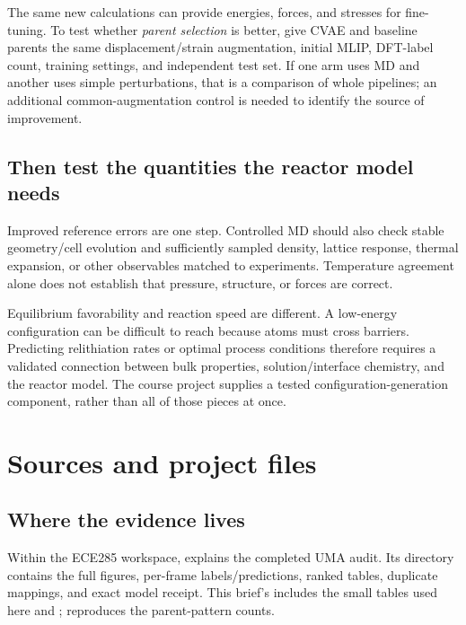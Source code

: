 The same new calculations can provide energies, forces, and stresses for fine-tuning. To test whether \emph{parent selection} is better, give CVAE and baseline parents the same displacement/strain augmentation, initial MLIP, DFT-label count, training settings, and independent test set. If one arm uses MD and another uses simple perturbations, that is a comparison of whole pipelines; an additional common-augmentation control is needed to identify the source of improvement.

\subsection*{Then test the quantities the reactor model needs}
Improved reference errors are one step. Controlled MD should also check stable geometry/cell evolution and sufficiently sampled density, lattice response, thermal expansion, or other observables matched to experiments. Temperature agreement alone does not establish that pressure, structure, or forces are correct.

Equilibrium favorability and reaction speed are different. A low-energy configuration can be difficult to reach because atoms must cross barriers. Predicting relithiation rates or optimal process conditions therefore requires a validated connection between bulk properties, solution/interface chemistry, and the reactor model. The course project supplies a tested configuration-generation component, rather than all of those pieces at once.


\clearpage
\section{Sources and project files}

\subsection*{Where the evidence lives}
Within the ECE285 workspace,  explains the completed UMA audit. Its  directory contains the full figures, per-frame labels/predictions, ranked tables, duplicate mappings, and exact model receipt. This brief's  includes the small tables used here and ;  reproduces the parent-pattern counts.

